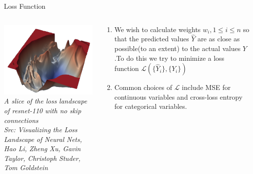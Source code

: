 \usebackgroundtemplate{ }

\begin{frame}{Loss Function}
  \begin{columns}[T]
  \begin{column}{0.4\textwidth}
	\includegraphics[width=\textwidth]{images/resnet110-noskip-loss.png}
	\tiny{\textit{A slice of the loss landscape of resnet-110 with no skip connections\\ Src: Visualizing the Loss Landscape of Neural Nets, Hao Li, Zheng Xu, Gavin Taylor, Christoph Studer, Tom Goldstein}}
  \end{column}
  \begin{column}{0.6\textwidth}
  \begin{enumerate}[$\bullet$]
  \item We wish to calculate weights $w_i,1\leq i\leq n$ so that the predicted values $\hat{Y}$ are as close as possible(to an extent) to the actual values $Y$.\pause To do this we try to minimize a loss function $\mathcal{L}(\{\hat Y_i\},\{Y_i\})$\pause
  \item Common choices of $\mathcal L$ include MSE for continuous variables and cross-loss entropy for categorical variables.
  \end{enumerate}
  \end{column}
\end{columns}
\end{frame}


